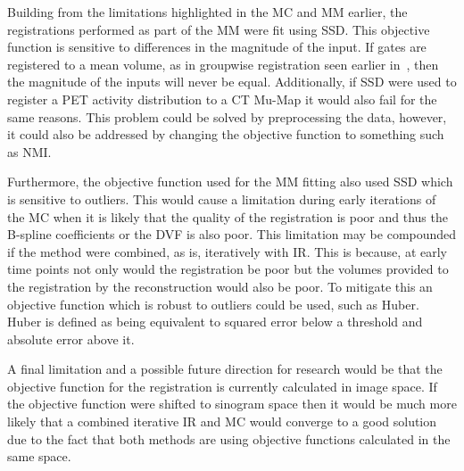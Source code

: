         Building from the limitations highlighted in the \gls{MC} and \gls{MM} earlier, the registrations performed as part of the \gls{MM} were fit using \gls{SSD}. This objective function is sensitive to differences in the magnitude of the input. If gates are registered to a mean volume, as in groupwise registration seen earlier in~, then the magnitude of the inputs will never be equal. Additionally, if \gls{SSD} were used to register a \gls{PET} activity distribution to a \gls{CT} \gls{Mu-Map} it would also fail for the same reasons. This problem could be solved by preprocessing the data, however, it could also be addressed by changing the objective function to something such as \gls{NMI}.
        
        Furthermore, the objective function used for the \gls{MM} fitting also used \gls{SSD} which is sensitive to outliers. This would cause a limitation during early iterations of the \gls{MC} when it is likely that the quality of the registration is poor and thus the B-spline coefficients or the \gls{DVF} is also poor. This limitation may be compounded if the method were combined, as is, iteratively with \gls{IR}. This is because, at early time points not only would the registration be poor but the volumes provided to the registration by the reconstruction would also be poor. To mitigate this an objective function which is robust to outliers could be used, such as Huber. Huber is defined as being equivalent to squared error below a threshold and absolute error above it.
        
        A final limitation and a possible future direction for research would be that the objective function for the registration is currently calculated in image space. If the objective function were shifted to sinogram space then it would be much more likely that a combined iterative \gls{IR} and \gls{MC} would converge to a good solution due to the fact that both methods are using objective functions calculated in the same space.
